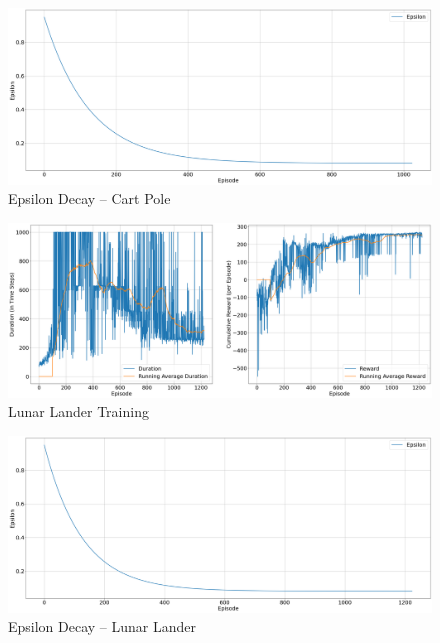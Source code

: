 \documentclass{article} %
\begin{document}
\begin{figure}[H]
    \begin{center}
        \includegraphics[width=\textwidth]{eps_cart.png}
    \end{center}
    \caption{Epsilon Decay -- Cart Pole}
\end{figure}

\begin{figure}[H]
    \begin{center}
        \includegraphics[width=\textwidth]{lunar_training_ddqn.png}
    \end{center}
    \caption{Lunar Lander Training}
\end{figure}

\begin{figure}[H]
    \begin{center}
        \includegraphics[width=\textwidth]{eps_lunar_ddqn.png}
    \end{center}
    \caption{Epsilon Decay -- Lunar Lander}
\end{figure}
\end{document}
